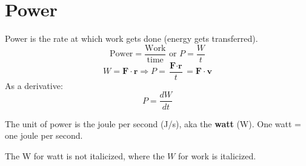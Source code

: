 \documentclass{article}
\begin{document}
\section{Power}
\begin{definition}
    Power is the rate at which work gets done (energy gets transferred).
    \begin{equation*}
        \text{Power} = \frac{\text{Work}}{\text{time}} \text{   or   } P=\frac{W}{t}
    \end{equation*}
    \begin{equation*}
        W = \textbf{F} \cdot \textbf{r} \Rightarrow P = \frac{\textbf{F}\cdot \textbf{r}}{t} = \textbf{F} \cdot \textbf{v}
    \end{equation*}
    As a derivative:
    \begin{equation*}
        P=\frac{dW}{dt}
    \end{equation*}
\end{definition}
\begin{unit}
    The unit of power is the joule per second (J/s), aka the \textbf{watt} (W). One watt = one joule per second.
    \begin{note}
        The W for watt is not italicized, where the $W$ for work is italicized.
    \end{note}
\end{unit}
\end{document}
